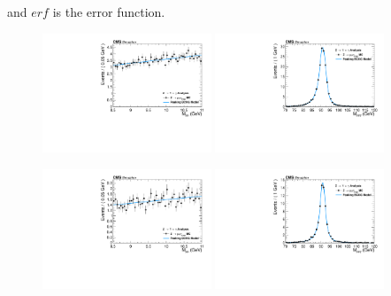 and $erf$ is the error function.



\begin{figure}[!htbp]
\begin{center}


\includegraphics[width=0.45\textwidth]{figures_and_tables/fitPlotFiles2D/ZToUpsilonPhotonSignalAndBackgroundFit/mMuMNU_ZToUpsilon1SPhotonSignalAndBackgroundFit_PeakingBackground_Cat0}\hspace*{1.cm}
\includegraphics[width=0.45\textwidth]{figures_and_tables/fitPlotFiles2D/ZToUpsilonPhotonSignalAndBackgroundFit/mHZ_ZToUpsilon1SPhotonSignalAndBackgroundFit_PeakingBackground_Cat0}\hspace*{1.cm}

\includegraphics[width=0.45\textwidth]{figures_and_tables/fitPlotFiles2D/ZToUpsilonPhotonSignalAndBackgroundFit/mMuMNU_ZToUpsilon1SPhotonSignalAndBackgroundFit_PeakingBackground_Cat1}\hspace*{1.cm}
\includegraphics[width=0.45\textwidth]{figures_and_tables/fitPlotFiles2D/ZToUpsilonPhotonSignalAndBackgroundFit/mHZ_ZToUpsilon1SPhotonSignalAndBackgroundFit_PeakingBackground_Cat1}\hspace*{1.cm}


\end{center}
\end{figure}
